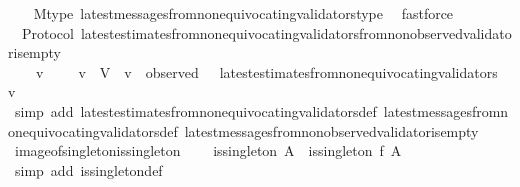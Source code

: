 \begin{isabellebody}
\ \ \isamarkupfalse%
\ M{\isacharunderscore}type\ latest{\isacharunderscore}messages{\isacharunderscore}from{\isacharunderscore}non{\isacharunderscore}equivocating{\isacharunderscore}validators{\isacharunderscore}type\ \isamarkupfalse%
\ fastforce%
\endisatagproof
{\isafoldproof}%
%
\isadelimproof
\isanewline
%
\endisadelimproof
\isanewline
{}\isamarkupfalse%
\ {\isacharparenleft}\ Protocol{\isacharparenright}\ latest{\isacharunderscore}estimates{\isacharunderscore}from{\isacharunderscore}non{\isacharunderscore}equivocating{\isacharunderscore}validators{\isacharunderscore}from{\isacharunderscore}non{\isacharunderscore}observed{\isacharunderscore}validator{\isacharunderscore}is{\isacharunderscore}empty\ {\isacharcolon}\isanewline
\ \ {\isachardoublequoteopen}{\isasymforall}\ {\isasymsigma}\ v{\isachardot}\ {\isasymsigma}\ {\isasymin}\ {\isasymSigma}\ {\isasymand}\ v\ {\isasymin}\ V\ {\isasymand}\ v\ {\isasymnotin}\ observed\ {\isasymsigma}\ {\isasymlongrightarrow}\ latest{\isacharunderscore}estimates{\isacharunderscore}from{\isacharunderscore}non{\isacharunderscore}equivocating{\isacharunderscore}validators\ {\isasymsigma}\ v\ {\isacharequal}\ {\isasymemptyset}{\isachardoublequoteclose}\isanewline
%
\isadelimproof
\ \ %
\endisadelimproof
%
\isatagproof
{}\isamarkupfalse%
\ {\isacharparenleft}simp\ add{\isacharcolon}\ latest{\isacharunderscore}estimates{\isacharunderscore}from{\isacharunderscore}non{\isacharunderscore}equivocating{\isacharunderscore}validators{\isacharunderscore}def\ latest{\isacharunderscore}messages{\isacharunderscore}from{\isacharunderscore}non{\isacharunderscore}equivocating{\isacharunderscore}validators{\isacharunderscore}def\ latest{\isacharunderscore}messages{\isacharunderscore}from{\isacharunderscore}non{\isacharunderscore}observed{\isacharunderscore}validator{\isacharunderscore}is{\isacharunderscore}empty{\isacharparenright}%
\endisatagproof
{\isafoldproof}%
%
\isadelimproof
\isanewline
%
\endisadelimproof
\isanewline
{}\isamarkupfalse%
\ image{\isacharunderscore}of{\isacharunderscore}singleton{\isacharunderscore}is{\isacharunderscore}singleton\ {\isacharcolon}\ \isanewline
\ \ {\isachardoublequoteopen}is{\isacharunderscore}singleton\ A\ {\isasymLongrightarrow}\ is{\isacharunderscore}singleton\ {\isacharparenleft}f\ {\isacharbackquote}A{\isacharparenright}{\isachardoublequoteclose}\ \isanewline
%
\isadelimproof
\ \ %
\endisadelimproof
%
\isatagproof
{}\isamarkupfalse%
\ {\isacharparenleft}simp\ add{\isacharcolon}\ is{\isacharunderscore}singleton{\isacharunderscore}def{\isacharparenright}\isanewline

\end{isabellebody}
